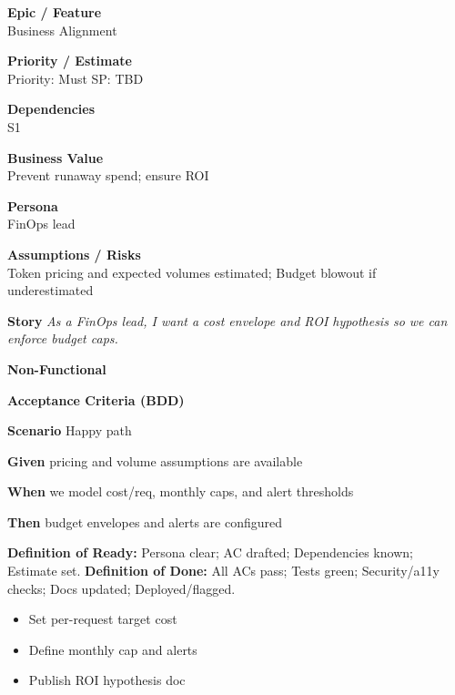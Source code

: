 \documentclass[11pt,a4paper]{article}
\newenvironment{StoryCard}[2][]{
  \begin{tcolorbox}[enhanced, breakable, sharp corners=all, colback=cardback, colframe=cardframe,
    title={#2}, fonttitle=\bfseries\large, boxrule=0.6pt, borderline west={2pt}{0pt}{accent}, #1]
}{
  \end{tcolorbox}
}
\newcommand{\badge}[1]{\pill{\footnotesize #1}}
\newcommand{\cb}{\(\square\)}
\newenvironment{TasksBox}[1][Tasks]{%
  \begin{tcolorbox}[enhanced,breakable,
    colback=cardback, colframe=cardframe, title={#1},
    borderline west={1.8pt}{0pt}{MidnightBlue},
    arc=2pt, boxrule=0.4pt,
    left=10pt,right=10pt,top=6pt,bottom=6pt,
    before skip=6pt, after skip=10pt
  ]
  \small
  \begin{itemize}[label=\cb, leftmargin=*, labelsep=0.6em, itemsep=4pt, topsep=2pt, parsep=0pt]
}{%
  \end{itemize}
  \end{tcolorbox}
}
\begin{document}
\begin{StoryCard}{S3 — Value hypothesis \& ROI guardrails}
\noindent\begin{minipage}[t]{0.49\textwidth}
\textbf{Epic / Feature}\\
Business Alignment

\medskip
\textbf{Priority / Estimate}\\
Priority: Must \quad SP: TBD

\medskip
\textbf{Dependencies}\\
S1
\end{minipage}\hfill
\begin{minipage}[t]{0.49\textwidth}
\textbf{Business Value}\\
Prevent runaway spend; ensure ROI

\medskip
\textbf{Persona}\\
FinOps lead

\medskip
\textbf{Assumptions / Risks}\\
Token pricing and expected volumes estimated; Budget blowout if underestimated
\end{minipage}

\medskip
\textbf{Story} \emph{As a FinOps lead, I want a cost envelope and ROI hypothesis so we can enforce budget caps.}

\medskip
\textbf{Non-Functional}
\badge{Performance}\ \badge{Cost}

\medskip
\textbf{Acceptance Criteria (BDD)}\par
\textbf{Scenario} Happy path\par
\textbf{Given} pricing and volume assumptions are available\par
\textbf{When} we model cost/req, monthly caps, and alert thresholds\par
\textbf{Then} budget envelopes and alerts are configured\par
\medskip
\footnotesize \textbf{Definition of Ready:} Persona clear; AC drafted; Dependencies known; Estimate set.\quad
\textbf{Definition of Done:} All ACs pass; Tests green; Security/a11y checks; Docs updated; Deployed/flagged.
\end{StoryCard}

\begin{TasksBox}[Tasks]
  \item Set per-request target cost
  \item Define monthly cap and alerts
  \item Publish ROI hypothesis doc
\end{TasksBox}
\clearpage
\end{document}
